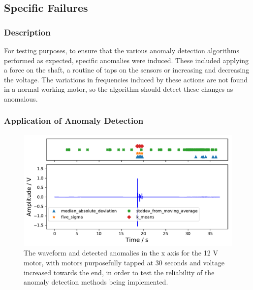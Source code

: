 
\subsection{Specific Failures}

\subsubsection{Description}

For testing purposes, to ensure that the various anomaly detection algorithms performed as expected, specific anomalies were induced. These included applying a force on the shaft, a routine of taps on the sensors or increasing and decreasing the voltage. The variations in frequencies induced by these actions are not found in a normal working motor, so the algorithm should detect these changes as anomalous. 

\subsubsection{Application of Anomaly Detection}

\begin{figure}[t]
    \includegraphics[width=1.0\textwidth]{fig/specific_anomaly_test1_motornorm12V.pdf}
    \caption[Specific Anomaly Test]{The waveform and detected anomalies in the x axis for the 12 V motor, with motors purposefully tapped at 30 seconds and voltage increased towards the end, in order to test the reliability of the anomaly detection methods being implemented.}
    \label{fig:spec_anom1}
\end{figure}


